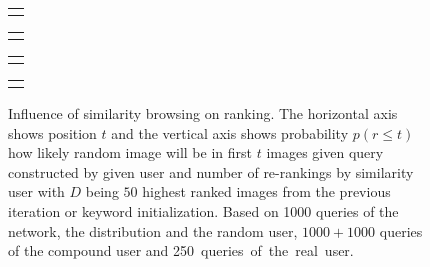 \begin{figure}[b!]
	\centering
	\begin{tabular}{@{}c@{}}
		\subfloat{
			
		}
	\end{tabular}
	\begin{tabular}{@{}c@{}}
		\subfloat{
			
		}
	\end{tabular}
	\begin{tabular}{@{}c@{}}
		\subfloat{
			
		}
	\end{tabular}
	\begin{tabular}{@{}c@{}}
		\subfloat{
			
		}
	\end{tabular}
	
	
	\caption[Influence of similarity browsing on ranking]{Influence of similarity browsing on ranking. The horizontal axis shows position $t$ and the vertical axis shows probability $p(r\leq t)$ how likely random image will be in first $t$ images given query constructed by given user and number of re-rankings by similarity user with $D$ being $50$ highest ranked images from the previous iteration or keyword initialization. Based on 1000 queries of the network, the distribution and the random user, $1000+1000$ queries of the compound user and 250~queries~of~the~real~user.}
	\label{fig:simulation_rerank}
\end{figure}
